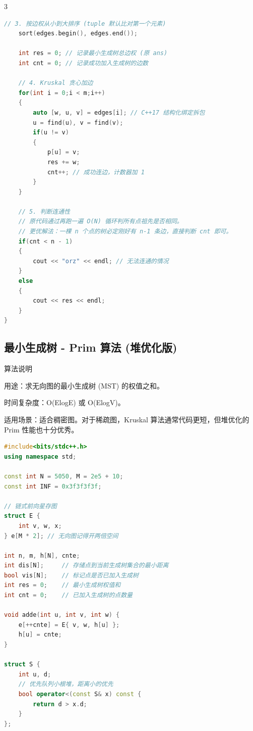 \documentclass[10pt,landscape,a4paper]{article}
\begin{document}
\begin{multicols*}{3}
\begin{lstlisting}[language=C++]
    // 3. 按边权从小到大排序 (tuple 默认比对第一个元素)
    sort(edges.begin(), edges.end());

    int res = 0; // 记录最小生成树总边权 (原 ans)
    int cnt = 0; // 记录成功加入生成树的边数

    // 4. Kruskal 贪心加边
    for(int i = 0;i < m;i++)
    {
        auto [w, u, v] = edges[i]; // C++17 结构化绑定拆包
        u = find(u), v = find(v);
        if(u != v)
        {
            p[u] = v;
            res += w;
            cnt++; // 成功连边，计数器加 1
        }
    }

    // 5. 判断连通性
    // 原代码通过再跑一遍 O(N) 循环判所有点祖先是否相同。
    // 更优解法：一棵 n 个点的树必定刚好有 n-1 条边，直接判断 cnt 即可。
    if(cnt < n - 1)
    {
        cout << "orz" << endl; // 无法连通的情况
    }
    else
    {
        cout << res << endl;
    }
}
\end{lstlisting}
\subsection*{最小生成树 - Prim 算法 (堆优化版)}
算法说明\par
用途：求无向图的最小生成树 (MST) 的权值之和。\par
时间复杂度：O(ElogE) 或 O(ElogV)。\par
适用场景：适合稠密图。对于稀疏图，Kruskal 算法通常代码更短，但堆优化的 Prim 性能也十分优秀。\par
\par{}\par
\begin{lstlisting}[language=C++]
#include<bits/stdc++.h>
using namespace std;

const int N = 5050, M = 2e5 + 10;
const int INF = 0x3f3f3f3f;

// 链式前向星存图
struct E {
    int v, w, x;
} e[M * 2]; // 无向图记得开两倍空间

int n, m, h[N], cnte;
int dis[N];     // 存储点到当前生成树集合的最小距离
bool vis[N];    // 标记点是否已加入生成树
int res = 0;    // 最小生成树权值和
int cnt = 0;    // 已加入生成树的点数量

void adde(int u, int v, int w) {
    e[++cnte] = E{ v, w, h[u] };
    h[u] = cnte;
}

struct S {
    int u, d;
    // 优先队列小根堆，距离小的优先
    bool operator<(const S& x) const {
        return d > x.d;
    }
};


\end{lstlisting}
\end{multicols*}
\end{document}

